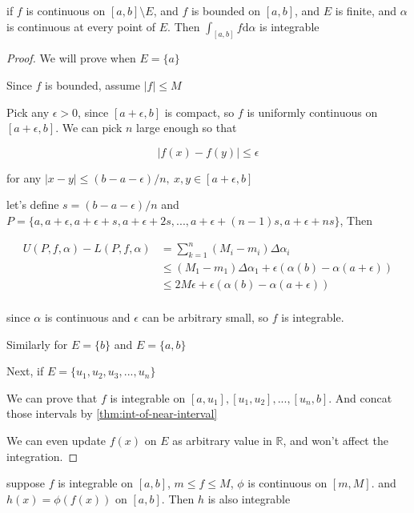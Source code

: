 \begin{thm}
    if $f$ is continuous on $[a,b] \setminus E$, and $f$ is bounded on $[a,b]$, and $E$ is finite, and $\alpha$ is continuous at every point of $E$.
    Then $\int_{[a,b]} f \mathrm{d} \alpha $ is integrable
\end{thm}


\begin{proof}
    We will prove when $E = \{ a \}$ 

    Since $f$ is bounded, assume $\left| f \right| \le M$

    Pick any $\epsilon > 0$, since $[a+\epsilon,b]$ is compact, so $f$ is uniformly continuous on $[a+\epsilon, b]$. We can pick $n$ large enough so that

    \[
        \left| f(x) - f(y) \right| \le \epsilon
    \]

    for any $\left| x-y\right| \le (b-a - \epsilon)/n,\: x,y \in [a + \epsilon, b]$
    
    let's define $s = (b-a-\epsilon)/n$ and $P = \{a, a + \epsilon,a+\epsilon+s, a+ \epsilon+2s, ..., a+\epsilon+(n-1)s, a+\epsilon+ns\}$, Then

    \begin{align*}
        U(P,f,\alpha) - L(P,f,\alpha) &= \sum_{k=1}^{n}\left(M_i - m_i \right) \Delta \alpha_i \\
        & \le \left(M_1 -m_1 \right) \Delta \alpha_1  + \epsilon (\alpha(b) - \alpha(a + \epsilon)) \\
        & \le 2M \epsilon  + \epsilon (\alpha(b) - \alpha(a + \epsilon)) \\
    \end{align*}

    since $\alpha$ is continuous and $\epsilon$ can be arbitrary small, so $f$ is integrable.

    Similarly for $E = \{ b \}$ and $E = \{a,b\}$


    Next, if $E = \{ u_1,u_2,u_3,...,u_n \}$

    We can prove that $f$ is integrable on $[a,u_1], [u_1,u_2], ..., [u_{n}, b]$. And concat those intervals by \autoref{thm:int-of-near-interval}

    We can even update $f(x)$ on $E$ as arbitrary value in $\mathbb{R}$, and won't affect the integration.
\end{proof}

\begin{thm}
    suppose $f$ is integrable on $[a,b]$, $m \le f \le M$, $\phi$ is continuous on $[m,M]$.
    and $h(x) = \phi(f(x))$ on $[a,b]$. Then $h$ is also integrable
\end{thm}

